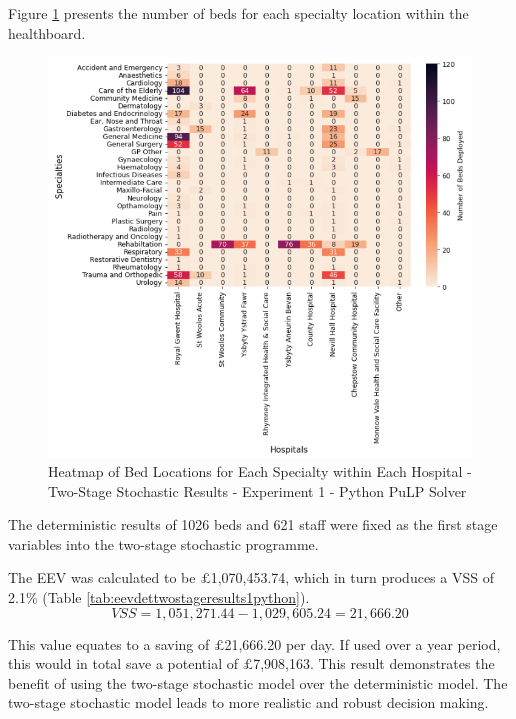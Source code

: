 \documentclass[../thesis.tex]{subfiles}
\begin{document}
Figure \ref{fig:pythonstocheatmap} presents the number of beds for each specialty location within the healthboard.


\begin{figure}
    \centering
    \includegraphics{Chapters/Chapter5/Figures/PythonStoc.png}
    \caption{Heatmap of Bed Locations for Each Specialty within Each Hospital - Two-Stage Stochastic Results - Experiment 1 - Python PuLP Solver}
    \label{fig:pythonstocheatmap}
\end{figure}


The deterministic results of 1026 beds and 621 staff were fixed as the first stage variables into the two-stage stochastic programme.

The EEV was calculated to be $\pounds$1,070,453.74, which in turn produces a VSS of 2.1\% (Table \ref{tab:eevdettwostageresults1python}). 
\begin{equation}
    VSS = 1,051,271.44 - 1,029,605.24 = 21,666.20
\end{equation}

This value equates to a saving of $\pounds$21,666.20 per day. If used over a year period, this would in total save a potential of $\pounds$7,908,163. This result demonstrates the benefit of using the two-stage stochastic model over the deterministic model. The two-stage stochastic model leads to more realistic and robust decision making.
\end{document}
